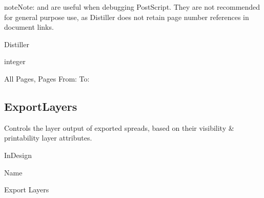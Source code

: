 \documentclass[letterpaper,12pt,english,openany,oneside]{sphinxmanual}
\begin{document}
\begin{sphinxadmonition}{note}{Note:}
 and  are useful when debugging PostScript. They are not recommended for general purpose use, as Distiller does not retain page number references in document links.
\end{sphinxadmonition}
\label{\detokenize{PDF_Create_CommonSettings:supported-by-8}}

Distiller

\label{\detokenize{PDF_Create_CommonSettings:type-8}}

integer

\label{\detokenize{PDF_Create_CommonSettings:ui-name-7}}

All Pages, Pages From: To:

\label{\detokenize{PDF_Create_CommonSettings:default-value-7}}

\begin{sphinxVerbatim}[commandchars=\\\{\}]
\end{sphinxVerbatim}


\subsection{ExportLayers}
\label{\detokenize{PDF_Create_CommonSettings:exportlayers}}
Controls the layer output of exported spreads, based on their visibility \& printability layer attributes.

\label{\detokenize{PDF_Create_CommonSettings:supported-by-9}}

InDesign

\label{\detokenize{PDF_Create_CommonSettings:type-9}}

Name

\label{\detokenize{PDF_Create_CommonSettings:ui-name-8}}

Export Layers

\label{\detokenize{PDF_Create_CommonSettings:default-value-8}}

\begin{sphinxVerbatim}[commandchars=\\\{\}]
\end{sphinxVerbatim}
\end{document}

